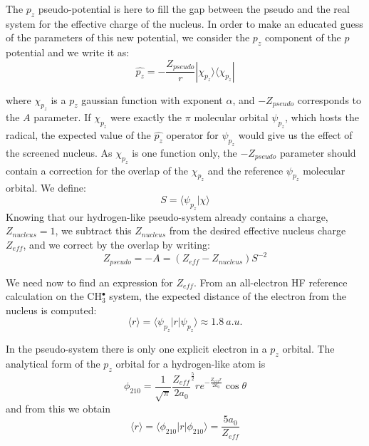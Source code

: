 \documentclass[aip,reprint]{revtex4-1}
\begin{document}
The  \(p_{z}\) pseudo-potential is here to fill the gap between the pseudo and the real system 
for the effective charge of the nucleus. 
In order to make an educated guess of the parameters of this new potential, we 
consider  the $p_z$ component of the $p$ potential and we write it as:
\begin{equation}
\widehat{p_z} = -\frac{Z_{pseudo}}{r} | \chi_{p_z} \rangle \langle \chi_{p_z} |
\end{equation}

where $\chi_{p_z}$ is a $p_z$ gaussian function with exponent $\alpha$,
and $-{Z_{pseudo}}$ corresponds to the $A$ parameter. 
If $\chi_{p_z}$ were exactly the $\pi$ molecular orbital \(\psi_{p_{z}}\), which hosts the
radical, the expected value of the $\widehat{p_z}$ operator for \(\psi_{p_{z}}\) would
give us the effect of the screened nucleus. 
As $\chi_{p_z}$ is one function only, 
the $-{Z_{pseudo}}$ parameter should contain a
correction for the overlap of the $\chi_{p_z}$ and the reference \(\psi_{p_{z}}\) 
molecular orbital. We define:
\begin{equation}
S = \langle \psi_{p_{z}} | \chi \rangle
\end{equation}
Knowing that our hydrogen-like pseudo-system already contains a charge, \(Z_{nucleus}=1\), 
we subtract this \(Z_{nucleus}\)  from the desired effective nucleus charge \(Z_{eff}\),
and we correct by the overlap by writing: 
\begin{equation}
\label{eq:Zeff}
Z_{pseudo} = -A = (Z_{eff} - Z_{nucleus})S^{-2}
\end{equation}

We need now to find an expression for \(Z_{eff}\). From an all-electron HF
reference calculation on the CH\(^{\bullet}_{3}\) system, the expected 
distance of the electron from the nucleus is computed: 
\begin{equation}
\langle r \rangle = \langle \psi_{p_{z}} | r | \psi_{p_{z}} \rangle \approx 1.8 \ a.u.
\label{equation:exp_r}
\end{equation}

In the pseudo-system there is only one explicit electron in a $p_z$ orbital. 
The analytical form of the \(p_{z}\) orbital for a hydrogen-like atom is\cite{me_structure_theory}
\begin{equation}
\phi_{210} = \frac{1}{\sqrt{\pi}} \frac{Z_{eff}}{2a_{0}} ^{\frac{5}{2}} re^{-\frac{Z_{eff}r}{2a_{0}}} \cos \theta
\end{equation}
and from this we obtain 
\begin{equation}
\label{equation:PsirPsi}
\langle r \rangle = \langle \phi_{210} | r | \phi_{210} \rangle = \frac{5a_{0}}{Z_{eff}}
\end{equation}
\end{document}
